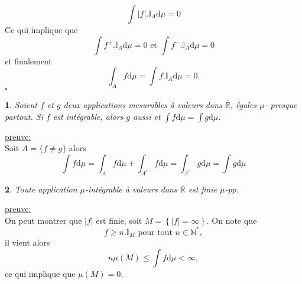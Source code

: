 \documentclass[8pt,notheorems]{beamer}
\def \N{\mathbb N}
\def \R{\mathbb{R}}
\newtheorem{prop}{\translate{Proposition}}
\theoremstyle{definition}
\theoremstyle{example}
\theoremstyle{mystyle}
\theoremstyle{plain}
\begin{document}
\begin{frame}[allowframebreaks]
$$
\int |f|.\mathbb{I}_A\text{d}\mu = 0
$$
Ce qui implique que 
$$
\int f^+.\mathbb{I}_A\text{d}\mu = 0\text{ et }\int f^-.\mathbb{I}_A\text{d}\mu = 0
$$
et finalement 
$$
\int_A f\text{d}\mu = \int f.\mathbb{I}_A\text{d}\mu = 0.
$$
$\square$
\begin{prop}
Soient $f$ et $g$ deux applications mesurables à valeurs dans $\overline{\R}$, égales $\mu$- presque partout. Si $f$ est intégrable, alors $g$ aussi et $\int f\text{d}\mu = \int g\text{d}\mu$.
\end{prop}
\underline{preuve:}\\
Soit $A = \{f\neq g\}$ alors 
$$
\int f\text{d}\mu = \int_A f\text{d}\mu + \int_{A^c} f\text{d}\mu = \int_{A^c} g\text{d}\mu  =  \int g\text{d}\mu
$$
\begin{prop}\label{prop:integrale_finie_fonction_finie}
Toute application $\mu$-intégrable à valeurs dans $\overline{\R}$ est finie $\mu$-pp. 
\end{prop}
\underline{preuve:}\\
On peut montrer que $|f|$ est finie, soit $M = \left\{|f| = \infty \right\}$. On note que 
$$
f\geq n.\mathbb{I}_M\text{ pour tout }n\in \N^{\ast},
$$ 
il vient alors 
$$
n\mu(M) \leq \int f\text{d}\mu <\infty,
$$
ce qui implique que $\mu(M) = 0$.
\end{frame}
\end{document}
